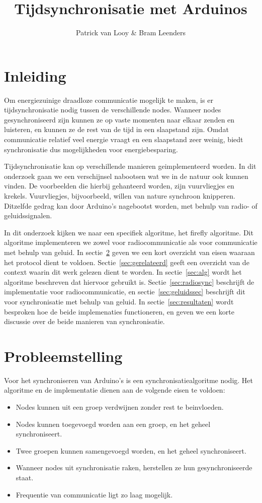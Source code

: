 \documentclass[a4paper,10pt]{article}
\title{Tijdsynchronisatie met Arduinos}
\author{Patrick van Looy \& Bram Leenders}
\begin{document}
\maketitle

\section{Inleiding}
Om energiezuinige draadloze communicatie mogelijk te maken, is er tijdsynchronisatie nodig tussen de verschillende nodes. Wanneer nodes gesynchroniseerd zijn kunnen ze op vaste momenten naar elkaar zenden en luisteren, en kunnen ze de rest van de tijd in een slaapstand zijn. Omdat communicatie relatief veel energie vraagt en een slaapstand zeer weinig, biedt synchronisatie dus mogelijkheden voor energiebesparing.

Tijdsynchronisatie kan op verschillende manieren geimplementeerd worden. In dit onderzoek gaan we een verschijnsel nabootsen wat we in de natuur ook kunnen vinden. De voorbeelden die hierbij gehanteerd worden, zijn vuurvliegjes en krekels. Vuurvliegjes, bijvoorbeeld, willen van nature synchroon knipperen\cite{buck1988synchronous}. Ditzelfde gedrag kan door Arduino's nagebootst worden, met behulp van radio- of geluidssignalen.

In dit onderzoek kijken we naar een specifiek algoritme, het firefly algoritme\cite{leidenfrost2009firefly, yang2013firefly}. Dit algoritme implementeren we zowel voor radiocommunicatie als voor communicatie met behulp van geluid. In sectie~\ref{sec:probleemstelling} geven we een kort overzicht van eisen waaraan het protocol dient te voldoen. Sectie~\ref{sec:gerelateerd} geeft een overzicht van de context waarin dit werk gelezen dient te worden. In sectie~\ref{sec:alg} wordt het algoritme beschreven dat hiervoor gebruikt is. Sectie~\ref{sec:radiosync} beschrijft de implementatie voor radiocommunicatie, en sectie~\ref{sec:geluidssec} beschrijft dit voor synchronisatie met behulp van geluid. In sectie~\ref{sec:resultaten} wordt besproken hoe de beide implemenaties functioneren, en geven we een korte discussie over de beide manieren van synchronisatie.

\section{Probleemstelling}\label{sec:probleemstelling}
Voor het synchroniseren van Arduino's is een synchronisatiealgoritme nodig. Het algoritme en de implementatie dienen aan de volgende eisen te voldoen:
\begin{itemize}
    \item Nodes kunnen uit een groep verdwijnen zonder rest te beinvloeden.
    \item Nodes kunnen toegevoegd worden aan een groep, en het geheel synchroniseert.
    \item Twee groepen kunnen samengevoegd worden, en het geheel synchroniseert.
    \item Wanneer nodes uit synchronisatie raken, herstellen ze hun gesynchroniseerde staat.
    \item Frequentie van communicatie ligt zo laag mogelijk.
\end{itemize}
\end{document}
